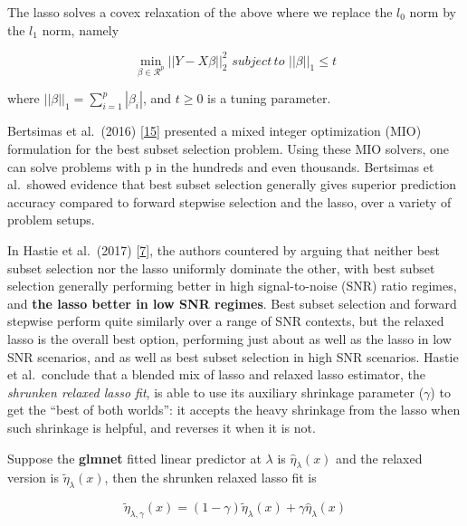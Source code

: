 \documentclass[
]{book}
\begin{document}
The lasso solves a covex relaxation of the above where we replace the
\(l_0\) norm by the \(l_1\) norm, namely

\begin{equation}

 \min_{\beta \in \mathcal{R}^p} ||Y - X\beta||^2_2 \, \, subject \, to \, \, ||\beta||_1 \leq t

 \label{eq:lasso}
\end{equation}

where \(||\beta||_1 = \sum_{i=1}^{p} |\beta_i|\), and \(t \geq 0\) is a tuning parameter.

Bertsimas et al.~(2016) {[}\protect\hyperlink{ref-Bertsimas:2016aa}{15}{]} presented a mixed integer optimization (MIO)
formulation for the best subset selection problem. Using these MIO solvers,
one can solve problems with p in the hundreds and even thousands.
Bertsimas et al.~showed evidence that
best subset selection generally gives superior prediction accuracy compared
to forward stepwise selection and the lasso, over a variety of problem setups.

In Hastie et al.~(2017) {[}\protect\hyperlink{ref-Hastie:2017aa}{7}{]}, the authors countered by arguing that
neither best subset selection nor the lasso uniformly dominate the other,
with best subset selection generally performing better in high signal-to-noise (SNR)
ratio regimes, and \textbf{the lasso better in low SNR regimes}.
Best subset selection and forward stepwise perform quite similarly over
a range of SNR contexts, but the relaxed lasso is the overall best option,
performing just about as well as the lasso in low SNR scenarios,
and as well as best subset selection in high SNR scenarios.
Hastie et al.~conclude that a blended mix of lasso and relaxed lasso estimator,
the \emph{shrunken relaxed lasso fit}, is able to use its auxiliary shrinkage
parameter (\(\gamma\)) to get the ``best of both worlds'':
it accepts the heavy shrinkage from the lasso when such shrinkage is helpful, and reverses it when it is not.

Suppose the \textbf{glmnet} fitted linear predictor at \(\lambda\) is \(\hat{\eta}_\lambda(x)\)
and the relaxed version is \(\tilde{\eta}_\lambda(x)\), then the shrunken relaxed lasso fit is

\begin{equation}

\tilde{\eta}_{\lambda,\gamma}(x)=(1-\gamma)\tilde{\eta}_\lambda(x) + \gamma \hat{\eta}_\lambda(x)

 \label{eq:blended}
\end{equation}
\end{document}
